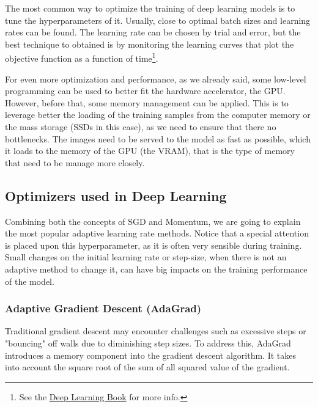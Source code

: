 \documentclass[]{article}
\theoremstyle{definition}
\begin{document}
The most common way to optimize the training of deep learning models is to tune the hyperparameters of it. Usually, close to optimal batch sizes and learning rates can be found. The learning rate can be chosen by trial and error, but the best technique to obtained is by monitoring the learning curves that plot the objective function as a function of time\footnote{See the \href{https://www.deeplearningbook.org/contents/optimization.html}{Deep Learning Book} for more info.}. 

For even more optimization and performance, as we already said, some low-level programming can be used to better fit the hardware accelerator, the GPU. However, before that, some memory management can be applied. This is to leverage better the loading of the training samples from the computer memory or the mass storage (SSDs in this case), as we need to ensure that there no bottlenecks. The images need to be served to the model as fast as possible, which it loads to the memory of the GPU (the VRAM), that is the type of memory that need to be manage more closely.

\subsection{Optimizers used in Deep Learning}
Combining both the concepts of SGD and Momentum, we are going to explain the most popular adaptive learning rate methods. Notice that a special attention is placed upon this hyperparameter, as it is often very sensible during training. Small changes on the initial learning rate or step-size, when there is not an adaptive method to change it, can have big impacts on the training performance of the model.

\subsubsection{Adaptive Gradient Descent (AdaGrad)}

Traditional gradient descent may encounter challenges such as excessive steps or "bouncing" off walls due to diminishing step sizes. To address this, AdaGrad introduces a memory component into the gradient descent algorithm. It takes into account the square root of the sum of all squared value of the gradient. 
\end{document}

